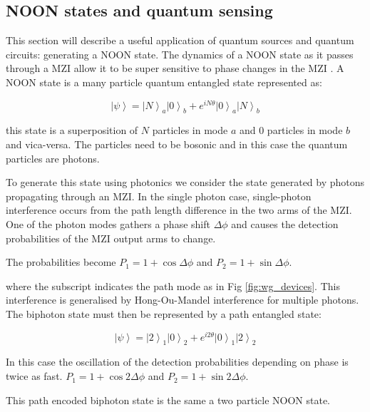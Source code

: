\subsection{NOON states and quantum sensing}

This section will describe a useful application of quantum sources and quantum
circuits: generating a NOON state. The dynamics of a NOON state as it passes
through a MZI allow it to be super sensitive to phase changes in the MZI \cite{afek2010high, PhysRevLett.107.083601}. A NOON
state is a many particle quantum entangled state represented as:

\begin{equation} \left|\psi\right\rangle = \left|N\right\rangle_{a}
\left|0\right\rangle_{b} + e^{iN\theta} \left|0\right\rangle_{a}
\left|N\right\rangle_{b} \end{equation}

this state is a superposition of $N$ particles in mode $a$ and 0 particles in
mode $b$ and vica-versa. The particles need to be bosonic and in this case the
quantum particles are photons.

To generate this state using photonics we consider the state generated by
photons propagating through an MZI. In the single photon case, single-photon
interference occurs from the path length difference in the two arms of the MZI.
One of the photon modes gathers a phase shift $\Delta \phi$ and causes the
detection probabilities of the MZI output arms to change.

The probabilities become $P_1 = 1 + \cos{\Delta \phi}$ and $P_2 = 1 +
\sin{\Delta \phi}$.

where the subscript indicates the path mode as in Fig \ref{fig:wg_devices}. This interference is generalised by Hong-Ou-Mandel interference
\cite{hong1987measurement} for multiple photons. The biphoton state must then be
represented by a path entangled state:

\begin{equation} \left|\psi\right\rangle = \left|2\right\rangle_{1}
\left|0\right\rangle_{2} + e^{i2\theta} \left|0\right\rangle_{1}
\left|2\right\rangle_{2} \end{equation}

In this case the oscillation of the detection probabilities depending on phase
is twice as fast. $P_{1} = 1 + \cos{2 \Delta \phi}$ and $P_{2} = 1 +
\sin{2 \Delta \phi}$.

This path encoded biphoton state is the same a two particle NOON state.

